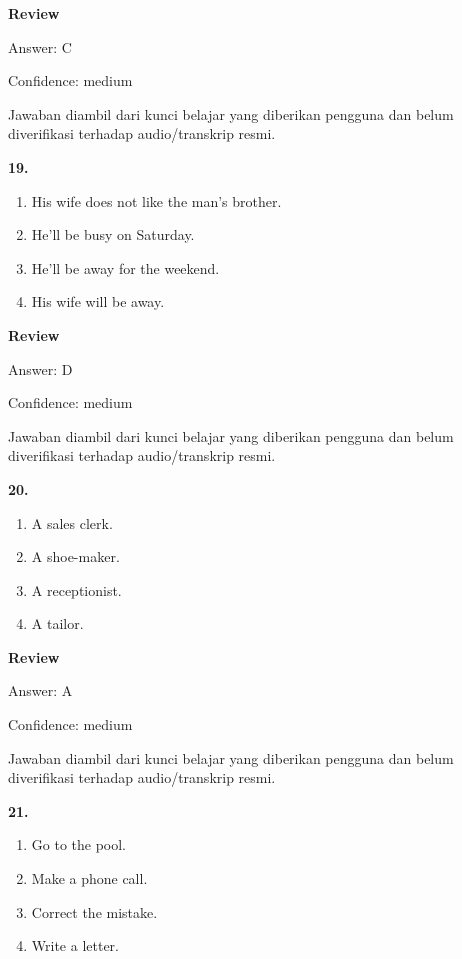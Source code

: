 \documentclass[12pt]{article}
\begin{document}
\setlength{\parskip}{0pt}
\setlength{\parindent}{0pt}
\textbf{Review}\par
Answer: C\par
Confidence: medium\par
Jawaban diambil dari kunci belajar yang diberikan pengguna dan belum diverifikasi terhadap audio/transkrip resmi.\par
\endgroup
\par
\vspace{0.25\baselineskip}
\noindent\textbf{19.}
\begin{enumerate}[label=(\Alph*),leftmargin=*,itemsep=0.2em]
\item His wife does not like the man's brother.
\item He'll be busy on Saturday.
\item He'll be away for the weekend.
\item His wife will be away.
\end{enumerate}
\par
\begingroup
\setlength{\parskip}{0pt}
\setlength{\parindent}{0pt}
\textbf{Review}\par
Answer: D\par
Confidence: medium\par
Jawaban diambil dari kunci belajar yang diberikan pengguna dan belum diverifikasi terhadap audio/transkrip resmi.\par
\endgroup
\par
\vspace{0.25\baselineskip}
\noindent\textbf{20.}
\begin{enumerate}[label=(\Alph*),leftmargin=*,itemsep=0.2em]
\item A sales clerk.
\item A shoe-maker.
\item A receptionist.
\item A tailor.
\end{enumerate}
\par
\begingroup
\setlength{\parskip}{0pt}
\setlength{\parindent}{0pt}
\textbf{Review}\par
Answer: A\par
Confidence: medium\par
Jawaban diambil dari kunci belajar yang diberikan pengguna dan belum diverifikasi terhadap audio/transkrip resmi.\par
\endgroup
\par
\vspace{0.25\baselineskip}
\noindent\textbf{21.}
\begin{enumerate}[label=(\Alph*),leftmargin=*,itemsep=0.2em]
\item Go to the pool.
\item Make a phone call.
\item Correct the mistake.
\item Write a letter.
\end{enumerate}
\end{document}
